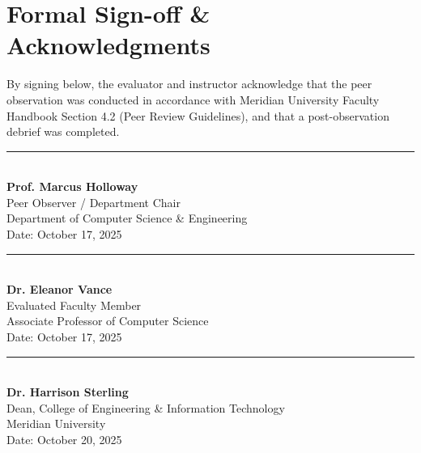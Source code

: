 \documentclass[10pt,a4paper]{article}
\begin{document}
\vspace{24pt}

\section{Formal Sign-off \& Acknowledgments}

By signing below, the evaluator and instructor acknowledge that the peer observation was conducted in accordance with Meridian University Faculty Handbook Section 4.2 (Peer Review Guidelines), and that a post-observation debrief was completed.

\vspace{20pt}

\begin{minipage}[t]{0.45\textwidth}
  \color{NavyPrimary}
  \rule{\textwidth}{0.6pt}\\[4pt]
  \textbf{Prof. Marcus Holloway}\\
  \small Peer Observer / Department Chair\\
  \scriptsize Department of Computer Science \& Engineering\\
  \scriptsize Date: October 17, 2025
\end{minipage}%
\hfill
\begin{minipage}[t]{0.45\textwidth}
  \color{NavyPrimary}
  \rule{\textwidth}{0.6pt}\\[4pt]
  \textbf{Dr. Eleanor Vance}\\
  \small Evaluated Faculty Member\\
  \scriptsize Associate Professor of Computer Science\\
  \scriptsize Date: October 17, 2025
\end{minipage}

\vspace{35pt}

\begin{minipage}[t]{0.45\textwidth}
  \color{NavyPrimary}
  \rule{\textwidth}{0.6pt}\\[4pt]
  \textbf{Dr. Harrison Sterling}\\
  \small Dean, College of Engineering \& Information Technology\\
  \scriptsize Meridian University\\
  \scriptsize Date: October 20, 2025
\end{minipage}%
\hfill
\begin{minipage}[t]{0.45\textwidth}
\end{minipage}
\end{document}
